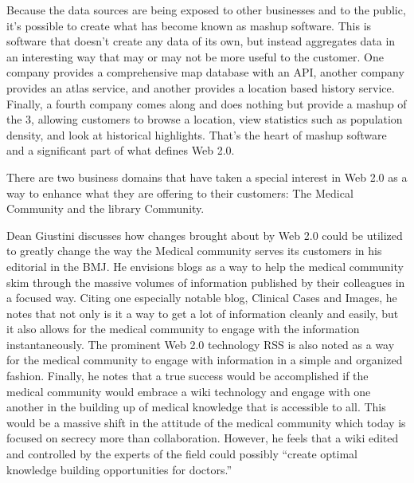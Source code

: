 Because the data sources are being exposed to other businesses and to the
public, it's possible to create what has become known as mashup software.  This
is software that doesn't create any data of its own, but instead aggregates data
in an interesting way that may or may not be more useful to the customer.  One
company provides a comprehensive map database with an API, another company
provides an atlas service, and another provides a location based history
service.  Finally, a fourth company comes along and does nothing but provide a
mashup of the 3, allowing customers to browse a location, view statistics such
as population density, and look at historical highlights.  That's the heart of
mashup software and a significant part of what defines Web 2.0.

There are two business domains that have taken a special interest in Web 2.0 as
a way to enhance what they are offering to their customers: The Medical
Community and the library Community.

Dean Giustini \citeyearpar{giustini2006} discusses how changes brought about by
Web 2.0 could be utilized to greatly change the way the Medical community serves
its customers in his editorial in the BMJ.  He envisions blogs as a way to help
the medical community skim through the massive volumes of information published
by their colleagues in a focused way.  Citing one especially notable blog,
Clinical Cases and Images, he notes that not only is it a way to get a lot of
information cleanly and easily, but it also allows for the medical community to
engage with the information instantaneously.  The prominent Web 2.0 technology
RSS is also noted as a way for the medical community to engage with information
in a simple and organized fashion.  Finally, he notes that a true success would
be accomplished if the medical community would embrace a wiki technology and
engage with one another in the building up of medical knowledge that is
accessible to all.  This would be a massive shift in the attitude of the medical
community which today is focused on secrecy more than collaboration.  However,
he feels that a wiki edited and controlled by the experts of the field could
possibly ``create optimal knowledge building opportunities for doctors.''

